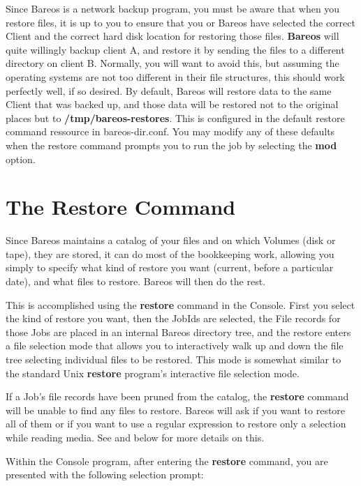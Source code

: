 Since Bareos is a network backup program, you must be aware that when you
restore files, it is up to you to ensure that you or Bareos have selected the
correct Client and the correct hard disk location for restoring those files.
{\bf Bareos} will quite willingly backup client A, and restore it by sending
the files to a different directory on client B. Normally, you will want to
avoid this, but assuming the operating systems are not too different in their
file structures, this should work perfectly well, if so desired.
By default, Bareos will restore data to the same Client that was backed
up, and those data will be restored not to the original places but to
{\bf /tmp/bareos-restores}. This is configured in the default restore
command ressource in bareos-dir.conf.  You may modify any of these defaults when the
restore command prompts you to run the job by selecting the {\bf mod}
option.

\label{Example1}
\section{The Restore Command}

Since Bareos maintains a catalog of your files and on which Volumes (disk or
tape), they are stored, it can do most of the bookkeeping work, allowing you
simply to specify what kind of restore you want (current, before a particular
date), and what files to restore. Bareos will then do the rest.

This is accomplished using the {\bf restore} command in the Console. First you
select the kind of restore you want, then the JobIds are selected,
the File records for those Jobs are placed in an internal Bareos directory
tree, and the restore enters a file selection mode that allows you to
interactively walk up and down the file tree selecting individual files to be
restored. This mode is somewhat similar to the standard Unix {\bf restore}
program's interactive file selection mode.

If a Job's file records have been pruned from the catalog, the {\bf restore}
command will be unable to find any files to restore. Bareos will ask if you
want to restore all of them or if you want to use a regular expression to
restore only a selection while reading media.
See  and below for more details on this.

Within the Console program, after entering the {\bf restore} command, you are
presented with the following selection prompt:

